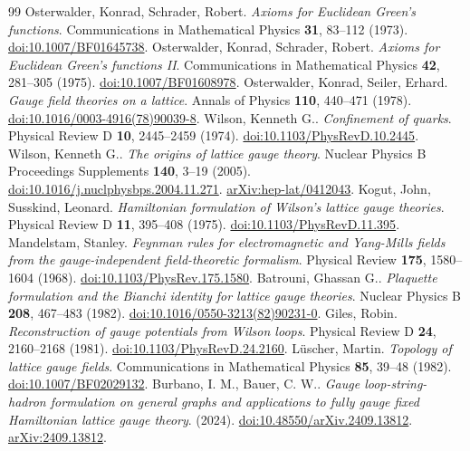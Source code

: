 \documentclass[10pt]{article}
\begin{document}
\begin{thebibliography}{99}
 Osterwalder, Konrad, Schrader, Robert. \emph{Axioms for Euclidean Green's functions}. Communications in Mathematical Physics \textbf{31}, 83--112 (1973). \href{https://doi.org/10.1007/BF01645738}{doi:10.1007/BF01645738}.
 Osterwalder, Konrad, Schrader, Robert. \emph{Axioms for Euclidean Green's functions II}. Communications in Mathematical Physics \textbf{42}, 281--305 (1975). \href{https://doi.org/10.1007/BF01608978}{doi:10.1007/BF01608978}.
 Osterwalder, Konrad, Seiler, Erhard. \emph{Gauge field theories on a lattice}. Annals of Physics \textbf{110}, 440--471 (1978). \href{https://doi.org/10.1016/0003-4916(78)90039-8}{doi:10.1016/0003-4916(78)90039-8}.
 Wilson, Kenneth G.. \emph{Confinement of quarks}. Physical Review D \textbf{10}, 2445--2459 (1974). \href{https://doi.org/10.1103/PhysRevD.10.2445}{doi:10.1103/PhysRevD.10.2445}.
 Wilson, Kenneth G.. \emph{The origins of lattice gauge theory}. Nuclear Physics B Proceedings Supplements \textbf{140}, 3--19 (2005). \href{https://doi.org/10.1016/j.nuclphysbps.2004.11.271}{doi:10.1016/j.nuclphysbps.2004.11.271}. \href{https://arxiv.org/abs/hep-lat/0412043}{arXiv:hep-lat/0412043}.
 Kogut, John, Susskind, Leonard. \emph{Hamiltonian formulation of Wilson's lattice gauge theories}. Physical Review D \textbf{11}, 395--408 (1975). \href{https://doi.org/10.1103/PhysRevD.11.395}{doi:10.1103/PhysRevD.11.395}.
 Mandelstam, Stanley. \emph{Feynman rules for electromagnetic and Yang-Mills fields from the gauge-independent field-theoretic formalism}. Physical Review \textbf{175}, 1580--1604 (1968). \href{https://doi.org/10.1103/PhysRev.175.1580}{doi:10.1103/PhysRev.175.1580}.
 Batrouni, Ghassan G.. \emph{Plaquette formulation and the Bianchi identity for lattice gauge theories}. Nuclear Physics B \textbf{208}, 467--483 (1982). \href{https://doi.org/10.1016/0550-3213(82)90231-0}{doi:10.1016/0550-3213(82)90231-0}.
 Giles, Robin. \emph{Reconstruction of gauge potentials from Wilson loops}. Physical Review D \textbf{24}, 2160--2168 (1981). \href{https://doi.org/10.1103/PhysRevD.24.2160}{doi:10.1103/PhysRevD.24.2160}.
 L{\"u}scher, Martin. \emph{Topology of lattice gauge fields}. Communications in Mathematical Physics \textbf{85}, 39--48 (1982). \href{https://doi.org/10.1007/BF02029132}{doi:10.1007/BF02029132}.
 Burbano, I. M., Bauer, C. W.. \emph{Gauge loop-string-hadron formulation on general graphs and applications to fully gauge fixed Hamiltonian lattice gauge theory}. (2024). \href{https://doi.org/10.48550/arXiv.2409.13812}{doi:10.48550/arXiv.2409.13812}. \href{https://arxiv.org/abs/2409.13812}{arXiv:2409.13812}.

\end{thebibliography}
\end{document}
